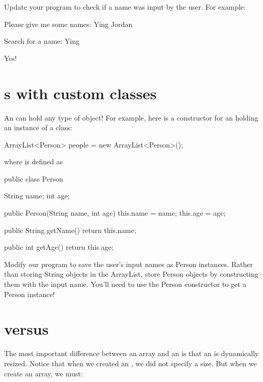 \begin{example}
Update your program to check if a name was input by the user. For example:

\begin{monospace}
Please give me some names:
Ying
Jordan

Search for a name:
Ying

Yes!
\end{monospace}
\end{example}

\section{s with custom classes}

An  can hold any type of object! For example, here is a constructor for an  holding an instance of a  class:

\begin{code}
ArrayList<Person> people = new ArrayList<Person>();
\end{code}

\noindent where  is defined as

\begin{code}
public class Person {

    String name;
    int age;

    public Person(String name, int age) {
        this.name = name;
        this.age = age;
    }

    public String getName() {
        return this.name;
    }

    public int getAge() {
        return this.age;
    }
}
\end{code}

\begin{example}
Modify our program to save the user's input names as Person instances. Rather than storing String objects in the ArrayList, store Person objects by constructing them with the input name. You'll need to use the Person constructor to get a Person instance!
\end{example}

\section{ versus }

The most important difference between an array and an  is that an  is dynamically resized. Notice that when we created an , we did not specify a size. But when we create an array, we must:

